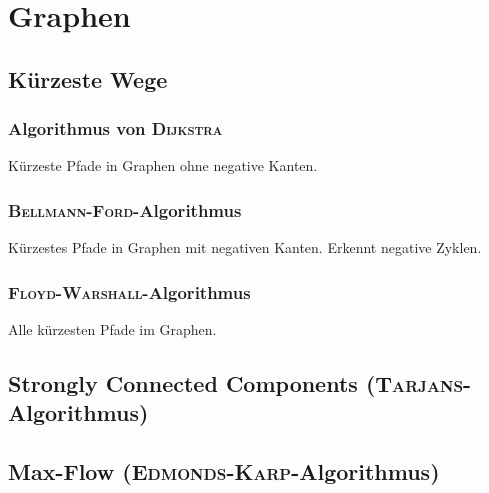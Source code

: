 \section{Graphen}

\subsection{Kürzeste Wege}

\subsubsection{Algorithmus von \textsc{Dijkstra}}
Kürzeste Pfade in Graphen ohne negative Kanten.


\subsubsection{\textsc{Bellmann-Ford}-Algorithmus}
Kürzestes Pfade in Graphen mit negativen Kanten. Erkennt negative Zyklen.


\subsubsection{\textsc{Floyd-Warshall}-Algorithmus}
Alle kürzesten Pfade im Graphen.


\subsection{Strongly Connected Components (\textsc{Tarjans}-Algorithmus)}


\subsection{Max-Flow (\textsc{Edmonds-Karp}-Algorithmus)}
